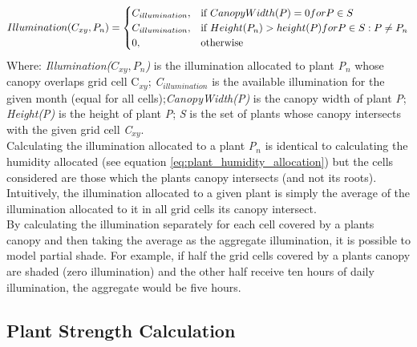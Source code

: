 \begin{equation}
\centering
Illumination(C_{xy}, P_{n}) = 
\begin{cases}
	C_{illumination}, & \text{if } CanopyWidth(P) = 0 for P \in S \\
	C_{illumination}, & \text{if } Height(P_{n}) > height(P) for P \in S : P \neq P_{n} \\
    0,              & \text{otherwise}
\end{cases}
\label{eq:illum_distribution}
\end{equation}
Where: \textit{Illumination($C_{xy},P_{n}$)} is the illumination allocated to plant \textit{P$_{n}$} whose canopy overlaps grid cell C$_{xy}$; \textit{C$_{illumination}$} is the available illumination for the given month (equal for all cells);\textit{CanopyWidth(P)} is the canopy width of plant \textit{P}; \textit{Height(P)} is the height of plant \textit{P}; \textit{S} is the set of plants whose canopy intersects with the given grid cell \textit{C$_{xy}$}.\\

Calculating the illumination allocated to a plant \textit{P$_{n}$} is identical to calculating the humidity allocated (see equation \ref{eq:plant_humidity_allocation}) but the cells considered are those which the plants canopy intersects (and not its roots). Intuitively, the illumination allocated to a given plant is simply the average of the illumination allocated to it in all grid cells its canopy intersect.\\

By calculating the illumination separately for each cell covered by a plants canopy and then taking the average as the aggregate illumination, it is possible to model partial shade. For example, if half the grid cells covered by a plants canopy are shaded (zero illumination) and the other half receive ten hours of daily illumination, the aggregate would be five hours.\\

\subsection{Plant Strength Calculation} \label{subsec:plant_strength_calc}

